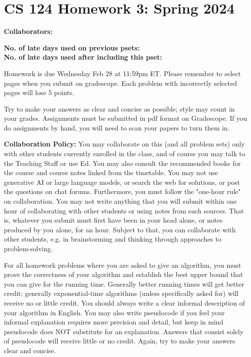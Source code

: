 \documentclass[11pt]{article}
\begin{document}


        \section*{CS 124 Homework 3: Spring 2024}


        \textbf{Collaborators: }

        \textbf{No. of late days used on previous psets: }\\
        \textbf{No. of late days used after including this pset: }

Homework is due {\color{blue} Wednesday Feb 28 at 11:59pm ET}. 
{\color{purple} Please remember to select pages when you submit on gradescope. Each problem with incorrectly selected pages will lose 5 points.}

Try to make your answers as clear and concise as possible;
style may count in your grades. Assignments must be submitted in pdf format on Gradescope. If you do assignments by hand, you will need to scan your papers to turn them in.


{\bf Collaboration Policy:} You may collaborate on this (and all problem sets) only with other students currently enrolled in the class, and of course you may talk to the Teaching Staff or use Ed. You may also consult the recommended books for the course and course notes linked from the timetable. You may not use generative AI or large language models, or search the web for solutions, or post the questions on chat forums. Furthermore, you must follow the "one-hour rule" on collaboration.  You may not write anything that you will submit within one hour of collaborating with other students or using notes from such sources. That is, whatever you submit must first have been in your head alone, or notes produced by you alone, for an hour. Subject to that, you can collaborate with other students, e.g. in brainstorming and thinking through approaches to problem-solving.


For all homework problems where you are asked to give an algorithm, you must prove the correctness
of your algorithm and establish the best upper bound that you can give for the running time. Generally
better running times will get better credit; generally exponential-time algorithms (unless specifically asked
for) will receive no or little credit. You should always write a clear informal description of your algorithm
in English. You may also write pseudocode if you feel your informal explanation requires more precision
and detail, but keep in mind pseudocode does NOT substitute for an explanation. Answers that consist
solely of pseudocode will receive little or no credit. Again, try to make your answers clear and concise.
\end{document}
